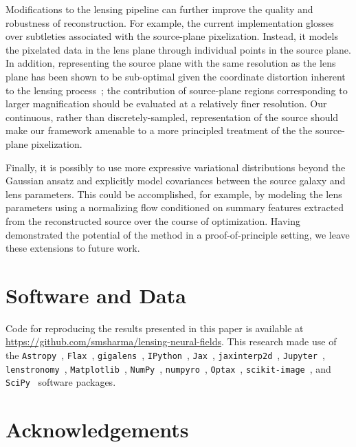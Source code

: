 \documentclass[nohyperref]{article}
\theoremstyle{plain}
\theoremstyle{definition}
\theoremstyle{remark}
\begin{document}
Modifications to the lensing pipeline can further improve the quality and robustness of reconstruction. For example, the current implementation glosses over subtleties associated with the source-plane pixelization. Instead, it models the pixelated data in the lens plane through individual points in the source plane. In addition, representing the source plane with the same resolution as the lens plane has been shown to be sub-optimal given the coordinate distortion inherent to the lensing process~\citep{warren2003semilinear}; the contribution of source-plane regions corresponding to larger magnification should be evaluated at a relatively finer resolution. Our {continuous}, rather than discretely-sampled, representation of the source should make our framework amenable to a more principled treatment of the the source-plane pixelization.

Finally, it is possibly to use more expressive variational distributions beyond the Gaussian ansatz and explicitly model covariances between the source galaxy and lens parameters. This could be accomplished, for example, by modeling the lens parameters using a normalizing flow conditioned on summary features extracted from the reconstructed source over the course of optimization. Having demonstrated the potential of the method in a proof-of-principle setting, we leave these extensions to future work.  

\section*{Software and Data}
Code for reproducing the results presented in this paper is available at \url{https://github.com/smsharma/lensing-neural-fields}. 
This research made use of the 
\texttt{Astropy}~\citep{astropy:2013, astropy:2018, astropy:2022},
\texttt{Flax}~\citep{flax2020github}, 
\texttt{gigalens}~\citep{gu2022giga}, 
\texttt{IPython}~\cite{PER-GRA:2007},
\texttt{Jax}~\cite{jax2018github,deepmind2020jax},
\texttt{jaxinterp2d}~\cite{jaxinterp2dgithub},
\texttt{Jupyter}~\cite{Kluyver2016JupyterN},
\texttt{lenstronomy}~\cite{birrer2018lenstronomy,Birrer2021},
\texttt{Matplotlib}~\cite{Hunter:2007},
\texttt{NumPy}~\cite{harris2020array},
\texttt{numpyro}~\cite{phan2019composable},
\texttt{Optax}~\citep{optax2020github},
\texttt{scikit-image}~\cite{scikit-image}, and
\texttt{SciPy}~\cite{2020SciPy-NMeth}
software packages.

\section*{Acknowledgements}
\end{document}
